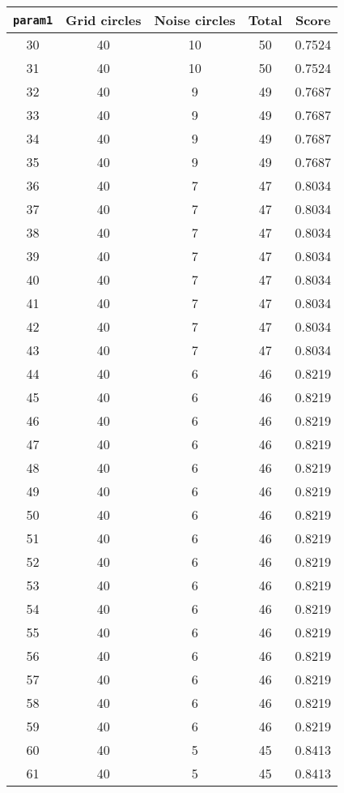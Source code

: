 \documentclass[letterpaper, 12pt]{article}
\begin{document}
\begin{longtable}{|c|c|c|c|c|}
\hline
\textbf{\texttt{param1}} & \textbf{Grid circles} & \textbf{Noise circles} & \textbf{Total} & \textbf{Score} \\
\hline
30 & 40 & 10 & 50 & 0.7524 \\
\hline
31 & 40 & 10 & 50 & 0.7524 \\
\hline
32 & 40 & 9 & 49 & 0.7687 \\
\hline
33 & 40 & 9 & 49 & 0.7687 \\
\hline
34 & 40 & 9 & 49 & 0.7687 \\
\hline
35 & 40 & 9 & 49 & 0.7687 \\
\hline
36 & 40 & 7 & 47 & 0.8034 \\
\hline
37 & 40 & 7 & 47 & 0.8034 \\
\hline
38 & 40 & 7 & 47 & 0.8034 \\
\hline
39 & 40 & 7 & 47 & 0.8034 \\
\hline
40 & 40 & 7 & 47 & 0.8034 \\
\hline
41 & 40 & 7 & 47 & 0.8034 \\
\hline
42 & 40 & 7 & 47 & 0.8034 \\
\hline
43 & 40 & 7 & 47 & 0.8034 \\
\hline
44 & 40 & 6 & 46 & 0.8219 \\
\hline
45 & 40 & 6 & 46 & 0.8219 \\
\hline
46 & 40 & 6 & 46 & 0.8219 \\
\hline
47 & 40 & 6 & 46 & 0.8219 \\
\hline
48 & 40 & 6 & 46 & 0.8219 \\
\hline
49 & 40 & 6 & 46 & 0.8219 \\
\hline
50 & 40 & 6 & 46 & 0.8219 \\
\hline
51 & 40 & 6 & 46 & 0.8219 \\
\hline
52 & 40 & 6 & 46 & 0.8219 \\
\hline
53 & 40 & 6 & 46 & 0.8219 \\
\hline
54 & 40 & 6 & 46 & 0.8219 \\
\hline
55 & 40 & 6 & 46 & 0.8219 \\
\hline
56 & 40 & 6 & 46 & 0.8219 \\
\hline
57 & 40 & 6 & 46 & 0.8219 \\
\hline
58 & 40 & 6 & 46 & 0.8219 \\
\hline
59 & 40 & 6 & 46 & 0.8219 \\
\hline
60 & 40 & 5 & 45 & 0.8413 \\
\hline
61 & 40 & 5 & 45 & 0.8413 \\

\end{longtable}
\end{document}
